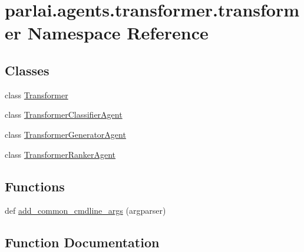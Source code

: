 \hypertarget{namespaceparlai_1_1agents_1_1transformer_1_1transformer}{}\section{parlai.\+agents.\+transformer.\+transformer Namespace Reference}
\label{namespaceparlai_1_1agents_1_1transformer_1_1transformer}
\subsection*{Classes}
\begin{DoxyCompactItemize}
\item 
class \hyperlink{classparlai_1_1agents_1_1transformer_1_1transformer_1_1Transformer}{Transformer}
\item 
class \hyperlink{classparlai_1_1agents_1_1transformer_1_1transformer_1_1TransformerClassifierAgent}{Transformer\+Classifier\+Agent}
\item 
class \hyperlink{classparlai_1_1agents_1_1transformer_1_1transformer_1_1TransformerGeneratorAgent}{Transformer\+Generator\+Agent}
\item 
class \hyperlink{classparlai_1_1agents_1_1transformer_1_1transformer_1_1TransformerRankerAgent}{Transformer\+Ranker\+Agent}
\end{DoxyCompactItemize}
\subsection*{Functions}
\begin{DoxyCompactItemize}
\item 
def \hyperlink{namespaceparlai_1_1agents_1_1transformer_1_1transformer_a916bc49d43dc0e244d24c47956c621ca}{add\+\_\+common\+\_\+cmdline\+\_\+args} (argparser)
\end{DoxyCompactItemize}


\subsection{Function Documentation}
\mbox{\label{namespaceparlai_1_1agents_1_1transformer_1_1transformer_a916bc49d43dc0e244d24c47956c621ca}} 
